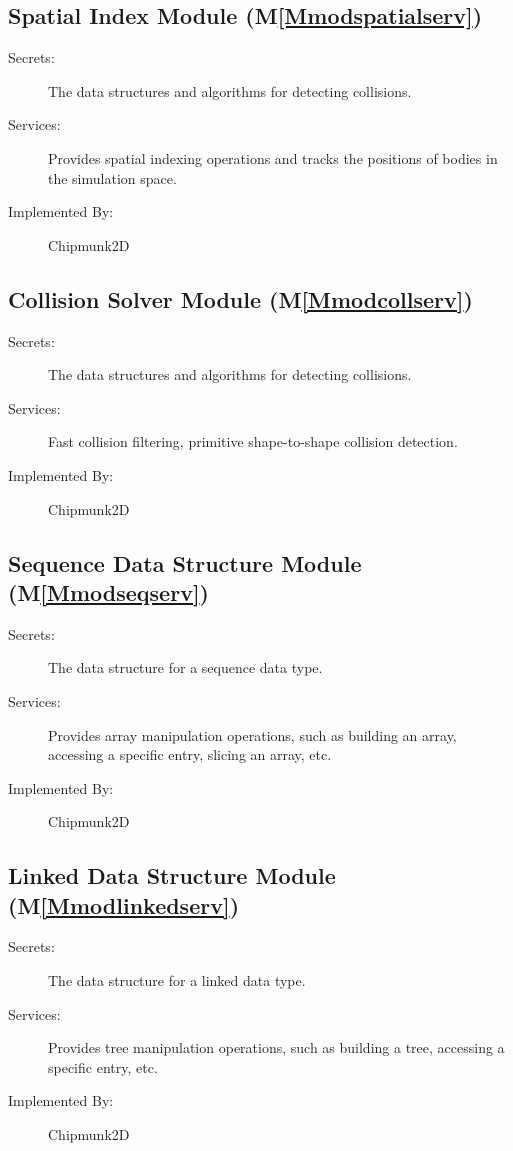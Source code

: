 \documentclass[12pt]{article}
\begin{document}
\subsection{Spatial Index Module (M\ref{Mmodspatialserv})}
\label{Sec:SpatIndeModu()}
\begin{description}
\item[Secrets:]The data structures and algorithms for detecting collisions.
\item[Services:]Provides spatial indexing operations and tracks the positions of bodies in the simulation space.
\item[Implemented By:]Chipmunk2D
\end{description}
\subsection{Collision Solver Module (M\ref{Mmodcollserv})}
\label{Sec:CollSolvModu()}
\begin{description}
\item[Secrets:]The data structures and algorithms for detecting collisions.
\item[Services:]Fast collision filtering, primitive shape-to-shape collision detection.
\item[Implemented By:]Chipmunk2D
\end{description}
\subsection{Sequence Data Structure Module (M\ref{Mmodseqserv})}
\label{Sec:SequDataStruModu()}
\begin{description}
\item[Secrets:]The data structure for a sequence data type.
\item[Services:]Provides array manipulation operations, such as building an array, accessing a specific entry, slicing an array, etc.
\item[Implemented By:]Chipmunk2D
\end{description}
\subsection{Linked Data Structure Module (M\ref{Mmodlinkedserv})}
\label{Sec:LinkDataStruModu()}
\begin{description}
\item[Secrets:]The data structure for a linked data type.
\item[Services:]Provides tree manipulation operations, such as building a tree, accessing a specific entry, etc.
\item[Implemented By:]Chipmunk2D
\end{description}
\end{document}
